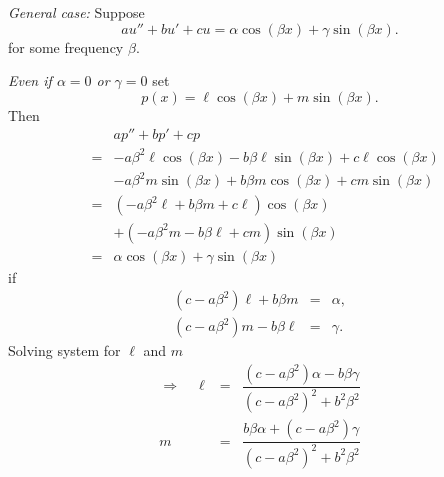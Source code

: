 %
% 
% 
% 

\emph{General case:} Suppose
\begin{equation}
au'' + bu' + cu 
=
\alpha \cos (\beta x) + \gamma \sin(\beta x).
\label{eq5.sincos}
\end{equation}
for some frequency $\beta$.

\emph{Even if $\alpha = 0$ or $\gamma = 0$ }
set
 \[
  p(x) = \ell \cos (\beta x) + m \sin (\beta x).
 \]
Then
\begin{eqnarray*}
&& a p'' + b p' + c p \\
&=& - a \beta^2 \ell \cos(\beta x)
 - b \beta \ell \sin(\beta x)
 + c \ell \cos (\beta x) \\
&&  - a \beta^2 m \sin(\beta x)
 + b \beta m \cos(\beta x)
 + c m \sin(\beta x) \\
&=& (-a \beta^2 \ell + b \beta m + c \ell) \cos (\beta x)\\
&& + (-a \beta^2 m - b \beta \ell + c m)\sin(\beta x)\\
&=&  \alpha \cos (\beta x) + \gamma \sin(\beta x)
\end{eqnarray*}
if
\begin{eqnarray*}
 (c-a\beta^2) \ell + b \beta m &=& \alpha,
\\
 (c-a \beta^2)m - b \beta \ell &=& \gamma.
\end{eqnarray*}
Solving system for $\ell$ and $m$
\begin{eqnarray*}
 \Rightarrow \quad \ell &=& \dfrac{(c-a\beta^2)\alpha - b \beta \gamma}{(c-a\beta^2)^2 + b^2 \beta^2}\\
 m &=& \dfrac{b \beta  \alpha + (c - a\beta^2)\gamma}{(c-a\beta^2)^2 + b^2\beta^2}
\end{eqnarray*}

